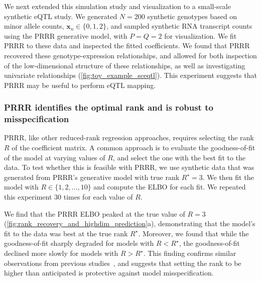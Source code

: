 \documentclass{bmcart}
\begin{document}
We next extended this simulation study and visualization to a small-scale synthetic eQTL study. We generated $N = 200$ synthetic genotypes based on minor allele counts, $\mathbf{x}_n \in \{0, 1, 2\}$, and sampled synthetic RNA transcript counts using the PRRR generative model, with $P=Q=2$ for visualization.
We fit PRRR to these data and inspected the fitted coefficients. We found that PRRR recovered these genotype-expression relationships, and allowed for both inspection of the low-dimensional structure of these relationships, as well as investigating univariate relationships (\autoref{fig:toy_example_sceqtl}). This experiment suggests that PRRR may be useful to perform eQTL mapping.

\subsubsection*{PRRR identifies the optimal rank and is robust to misspecification}
PRRR, like other reduced-rank regression approaches, requires selecting the rank $R$ of the coefficient matrix. A common approach is to evaluate the goodness-of-fit of the model at varying values of $R$, and select the one with the best fit to the data. To test whether this is feasible with PRRR, we use synthetic data that was generated from PRRR's generative model with true rank $R^\star=3$. We then fit the model with $R \in \{1, 2, \dots, 10\}$ and compute the ELBO for each fit. We repeated this experiment $30$ times for each value of $R$.

We find that the PRRR ELBO peaked at the true value of $R=3$ (\autoref{fig:rank_recovery_and_highdim_prediction}a), demonstrating that the model's fit to the data was best at the true rank $R^{\star}$. Moreover, we found that while the goodness-of-fit sharply degraded for models with $R < R^\star$, the goodness-of-fit declined more slowly for models with $R > R^\star$. This finding confirms similar observations from previous studies~\citep{Qian2020.05.30.125252}, and suggests that setting the rank to be higher than anticipated is protective against model misspecification.
\end{document}
